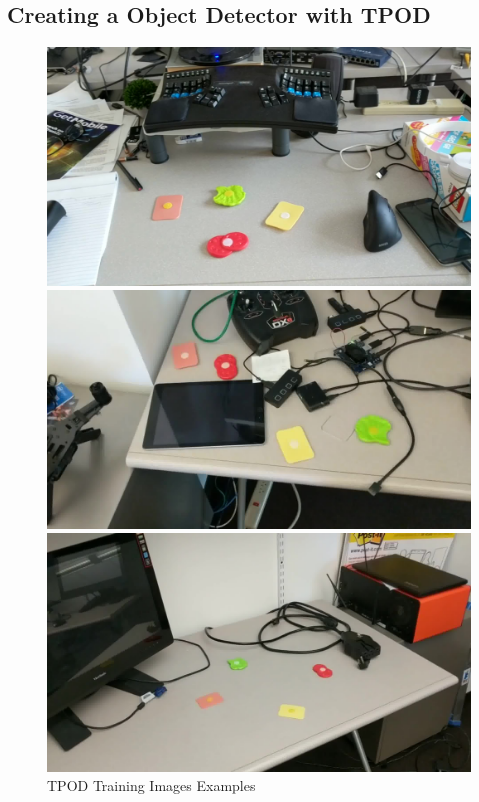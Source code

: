 \subsection{Creating a Object Detector with TPOD}

\begin{figure}[]
  \centering
  \begin{minipage}[b]{0.32\textwidth}
    \includegraphics[width=\textwidth]{FIGS/sandwich-training-1.jpg}
  \end{minipage}
  \begin{minipage}[b]{0.32\textwidth}
    \includegraphics[width=\textwidth]{FIGS/sandwich-training-2.jpg}
  \end{minipage}
  \begin{minipage}[b]{0.32\textwidth}
    \includegraphics[width=\textwidth]{FIGS/sandwich-training-3.jpg}
  \end{minipage}
    \caption{TPOD Training Images Examples}
  \label{figs:tpod-example-training-images}
\end{figure}


